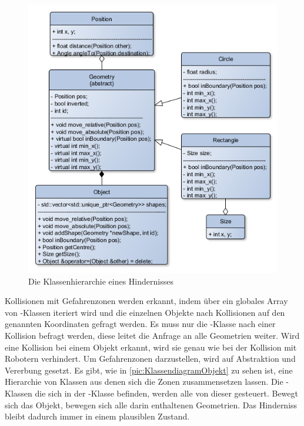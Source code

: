 \begin{figure}
	\includegraphics[width=\pictureWidthBig,keepaspectratio]{graphics/Klassendiagramme/KlassendiagrammObject.png}
	\caption{Die Klassenhierarchie eines Hindernisses}
	\label{pic:KlassendiagramObjekt}
\end{figure}

Kollisionen mit Gefahrenzonen werden erkannt, indem über ein globales Array von -Klassen iteriert wird und die einzelnen Objekte nach Kollisionen auf den genannten Koordinaten gefragt werden. Es muss nur die -Klasse nach einer Kollision befragt werden, diese leitet die Anfrage an alle Geometrien weiter. Wird eine Kollision bei einem Objekt erkannt, wird sie genau wie bei der Kollision mit Robotern verhindert.
Um Gefahrenzonen darzustellen, wird auf Abstraktion und Vererbung gesetzt. Es gibt, wie in \autoref{pic:KlassendiagramObjekt} zu sehen ist, eine Hierarchie von Klassen aus denen sich die Zonen zusammensetzen lassen. Die -Klassen die sich in der -Klasse befinden, werden alle von dieser gesteuert. Bewegt sich das Objekt, bewegen sich alle darin enthaltenen Geometrien. Das Hinderniss bleibt dadurch immer in einem plausiblen Zustand. 


